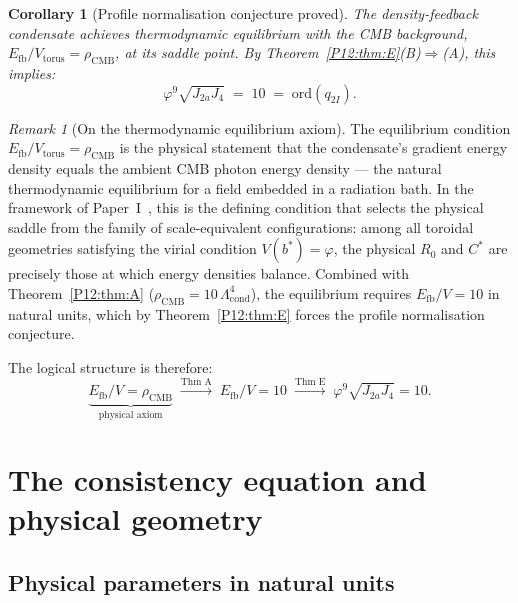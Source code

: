 \documentclass[11pt,a4paper]{article}
\newtheorem{corollary}[theorem]{Corollary}
\theoremstyle{definition}
\theoremstyle{remark}
\newtheorem{remark}[theorem]{Remark}
\newcommand{\vp}{\varphi}
\newcommand{\Efb}{E_{\mathrm{fb}}}
\newcommand{\Ja}{J_{2a}}
\newcommand{\Jfour}{J_{4}}
\newcommand{\Lcond}{\Lambda_{\mathrm{cond}}}
\newcommand{\rCMB}{\rho_{\mathrm{CMB}}}
\newcommand{\ord}{\mathrm{ord}}
\begin{document}
\begin{corollary}[Profile normalisation conjecture proved]
\label{P12:cor:proof}
The density-feedback condensate achieves thermodynamic equilibrium
with the CMB background, $\Efb/V_{\mathrm{torus}}=\rCMB$, at its saddle point.
By Theorem~\ref{P12:thm:E}(B)$\Rightarrow$(A), this implies:
\begin{equation}
  \boxed{\vp^9\sqrt{\Ja\Jfour} \;=\; 10 \;=\; \ord(q_{2I}).}
  \label{P12:eq:conjecture_proved}
\end{equation}
\end{corollary}

\begin{remark}[On the thermodynamic equilibrium axiom]
\label{P12:rem:equilibrium}
The equilibrium condition $\Efb/V_{\mathrm{torus}}=\rCMB$ is the
physical statement that the condensate's gradient energy density
equals the ambient CMB photon energy density --- the natural
thermodynamic equilibrium for a field embedded in a radiation bath.
In the framework of Paper~I~\cite{Paper1}, this is the defining
condition that selects the physical saddle from the family of
scale-equivalent configurations: among all toroidal geometries satisfying
the virial condition $V(b^*)=\vp$, the physical $R_0$ and $C^*$ are
precisely those at which energy densities balance.
Combined with Theorem~\ref{P12:thm:A} ($\rCMB=10\,\Lcond^4$),
the equilibrium requires $\Efb/V=10$ in natural units,
which by Theorem~\ref{P12:thm:E} forces the profile normalisation conjecture.

The logical structure is therefore:
\[
  \underbrace{\Efb/V = \rCMB}_{\text{physical axiom}}
  \;\xrightarrow{\text{Thm~A}}\;
  \Efb/V = 10
  \;\xrightarrow{\text{Thm~E}}\;
  \vp^9\sqrt{\Ja\Jfour} = 10.
\]
\end{remark}



\section{The consistency equation and physical geometry}
\label{P12:sec:consistency}

\subsection{Physical parameters in natural units}
\end{document}
